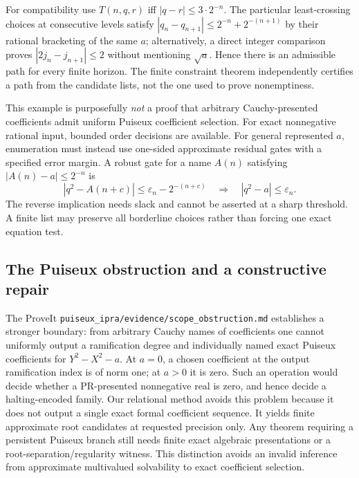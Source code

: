 \documentclass[11pt]{article}
\begin{document}
For compatibility use $T(n,q,r)$ iff $|q-r|\le 3\cdot 2^{-n}$. The particular least-crossing choices at consecutive levels satisfy $|q_n-q_{n+1}|\le 2^{-n}+2^{-(n+1)}$ by their rational bracketing of the same $a$; alternatively, a direct integer comparison proves $|2j_n-j_{n+1}|\le2$ without mentioning $\sqrt a$. Hence there is an admissible path for every finite horizon. The finite constraint theorem independently certifies a path from the candidate lists, not the one used to prove nonemptiness.

This example is purposefully \emph{not} a proof that arbitrary Cauchy-presented coefficients admit uniform Puiseux coefficient selection. For exact nonnegative rational input, bounded order decisions are available. For general represented $a$, enumeration must instead use one-sided approximate residual gates with a specified error margin. A robust gate for a name $A(n)$ satisfying $|A(n)-a|\le2^{-n}$ is
\[ |q^2-A(n+c)|\le \varepsilon_n-2^{-(n+c)} \quad\Longrightarrow\quad |q^2-a|\le\varepsilon_n.\]
The reverse implication needs slack and cannot be asserted at a sharp threshold. A finite list may preserve all borderline choices rather than forcing one exact equation test.

\subsection{The Puiseux obstruction and a constructive repair}
The ProveIt \texttt{puiseux\_ipra/evidence/scope\_obstruction.md} establishes a stronger boundary: from arbitrary Cauchy names of coefficients one cannot uniformly output a ramification degree and individually named exact Puiseux coefficients for $Y^2-X^2-a$. At $a=0$, a chosen coefficient at the output ramification index is of norm one; at $a>0$ it is zero. Such an operation would decide whether a PR-presented nonnegative real is zero, and hence decide a halting-encoded family. Our relational method avoids this problem because it does not output a single exact formal coefficient sequence. It yields finite approximate root candidates at requested precision only. Any theorem requiring a persistent Puiseux branch still needs finite exact algebraic presentations or a root-separation/regularity witness. This distinction avoids an invalid inference from approximate multivalued solvability to exact coefficient selection.
\end{document}

